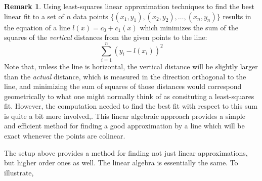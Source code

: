 \documentclass[11pt,notitlepage]{article}
\numberwithin{equation}{section}
\theoremstyle{plain}
\theoremstyle{definition}
\newtheorem{remark}[equation]{Remark}
\begin{document}
\begin{remark} Using least-squares linear approximation techniques to find the best linear fit to a set of $n$ data points $\{(x_1,y_1), (x_2,y_2),\dots,(x_n,y_n)\}$ results in the equation of a line $l(x) = c_0 + c_1(x)$ which minimizes the sum of the squares of the {\it vertical} distances from the given points to the line:
\[
\sum_{i=1}^n (y_i - l(x_i))^2
\]
Note that, unless the line is horizontal, the vertical distance will be slightly larger than the {\it actual} distance, which is measured in the direction orthogonal to the line, and minimizing the sum of squares of those distances would correspond geometrically to what one might normally think of as consituting a least-squares fit. However, the computation needed to find the best fit with respect to this sum is quite a bit more involved,. This linear algebraic approach provides a simple and efficient method for finding a good approximation by a line which will be exact whenever the points are colinear.
\end{remark}

The setup above provides a method for finding not just linear approximations, but higher order ones as well. The linear algebra is essentially the same. To illustrate,
\end{document}
